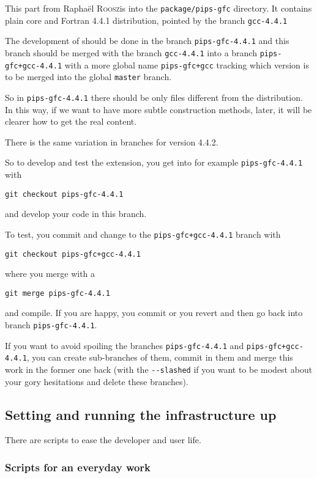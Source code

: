 \documentclass[a4paper]{article}
\begin{document}
This part from Raphaël \textsc{Roosz}is into the \texttt{package/pips-gfc}
directory. It contains plain \Agcc core and Fortran 4.4.1 distribution,
pointed by the branch \texttt{gcc-4.4.1}

The development of \Apipsgfc should be done in the branch
\texttt{pips-gfc-4.4.1} and this branch should be merged with the
branch \texttt{gcc-4.4.1} into a branch \texttt{pips-gfc+gcc-4.4.1} with a
more global name \texttt{pips-gfc+gcc} tracking which version is to be
merged into the global \texttt{master} branch.

So in \texttt{pips-gfc-4.4.1} there should be only files different from
the \Agcc distribution. In this way, if we want to have more subtle
construction methods, later, it will be clearer how to get the real
content.

There is the same variation in branches for version 4.4.2.

So to develop and test the \Apipsgfc extension, you get into for example
\texttt{pips-gfc-4.4.1} with
\begin{verbatim}
git checkout pips-gfc-4.4.1
\end{verbatim}
and develop your code in this branch.

To test, you commit and change to the \texttt{pips-gfc+gcc-4.4.1} branch with
\begin{verbatim}
git checkout pips-gfc+gcc-4.4.1
\end{verbatim}
where you merge with a
\begin{verbatim}
git merge pips-gfc-4.4.1
\end{verbatim}
and compile. If you are happy, you commit or you revert and then go back
into branch \texttt{pips-gfc-4.4.1}.

If you want to avoid spoiling the branches \texttt{pips-gfc-4.4.1} and
\texttt{pips-gfc+gcc-4.4.1}, you can create sub-branches of them, commit in
them and merge this work in the former one back (with the \verb|--slashed|
if you want to be modest about your gory hesitations \smiley{} and delete
these branches).


\subsection{Setting and running the infrastructure up}
\label{sec:setup}

There are scripts to ease the developer and user life.


\subsubsection{Scripts for an everyday work}
\label{sec:an-everyday-work}
\end{document}
